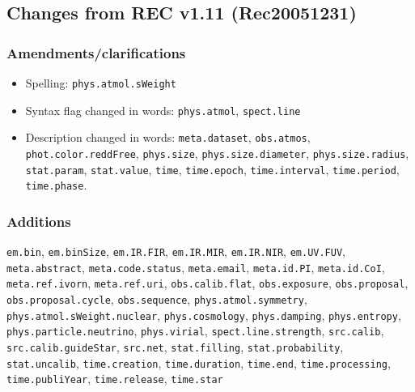 \documentclass[11pt,a4paper]{ivoa}
\begin{document}
\subsection{Changes from REC v1.11 (Rec20051231)}
\subsubsection*{Amendments/clarifications}
\begin{itemize}
\item Spelling: {\tt phys.atmol.sWeight}
\item Syntax flag changed in words: {\tt phys.atmol}, {\tt spect.line}
\item Description changed in words: {\tt meta.dataset}, {\tt obs.atmos}, {\tt phot.color.reddFree}, 
{\tt phys.size}, {\tt phys.size.diameter}, {\tt phys.size.radius}, {\tt stat.param}, {\tt stat.value}, 
{\tt time}, {\tt time.epoch}, {\tt time.interval}, {\tt time.period}, {\tt time.phase}.
\end{itemize}

\subsubsection*{Additions}
{\tt em.bin}, {\tt em.binSize}, {\tt em.IR.FIR}, {\tt em.IR.MIR}, {\tt em.IR.NIR}, {\tt em.UV.FUV}, 
{\tt meta.abstract}, {\tt meta.code.status}, {\tt meta.email}, {\tt meta.id.PI}, {\tt meta.id.CoI}, 
{\tt meta.ref.ivorn}, {\tt meta.ref.uri}, {\tt obs.calib.flat}, {\tt obs.exposure}, {\tt obs.proposal}, 
{\tt obs.proposal.cycle}, {\tt obs.sequence}, {\tt phys.atmol.symmetry}, {\tt phys.atmol.sWeight.nuclear}, 
{\tt phys.cosmology}, {\tt phys.damping}, {\tt phys.entropy}, {\tt phys.particle.neutrino}, {\tt phys.virial}, 
{\tt spect.line.strength}, {\tt src.calib}, {\tt src.calib.guideStar}, {\tt src.net}, {\tt stat.filling}, 
{\tt stat.probability}, {\tt stat.uncalib}, {\tt time.creation}, {\tt time.duration}, {\tt time.end}, 
{\tt time.processing}, {\tt time.publiYear}, {\tt time.release}, {\tt time.star}
\end{document}
